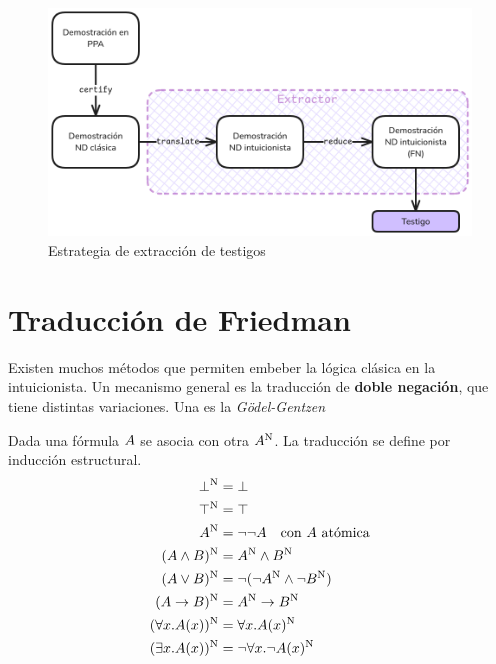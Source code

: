 \begin{figure}
    \includegraphics[scale=0.35]{img/fri-extract-strategy.png}
    \centering
    \caption{Estrategia de extracción de testigos}
    \label{fri:fig:strat}
\end{figure}

\section{Traducción de Friedman}
\label{fri:sec:fri}

Existen muchos métodos que permiten embeber la lógica clásica en la
intuicionista. Un mecanismo general es la traducción de
\textbf{doble negación}, que tiene distintas variaciones. Una es la
\textit{Gödel-Gentzen} \cite{Avigad1998-FEFOFD}

\begin{definition} Dada una fórmula $A$
    se asocia con otra $A^{\text{N}}$. La traducción se define por inducción
    estructural.
    \begin{align*}
        \bot^{\text{N}}                      & = \bot                                           \\
        \top^{\text{N}}                       & = \top                                            \\
        A^{\text{N}}                        & = \neg\neg A \quad \text{con $A$ atómica} \\
        (A \wedge B)^{\text{N}}       & = A^{\text{N}} \wedge B^{\text{N}}                    \\
        (A \vee B)^{\text{N}}        & = \neg(\neg A^{\text{N}} \wedge \neg B^{\text{N}})   \\
        (A \to B)^{\text{N}}       & = A^{\text{N}} \to B^{\text{N}}                    \\
        (\forall x . A(x))^{\text{N}} & = \forall x . A(x)^{\text{N}}                   \\
        (\exists x . A(x))^{\text{N}} & = \neg \forall x . \neg A(x)^{\text{N}}
    \end{align*}
\end{definition}


